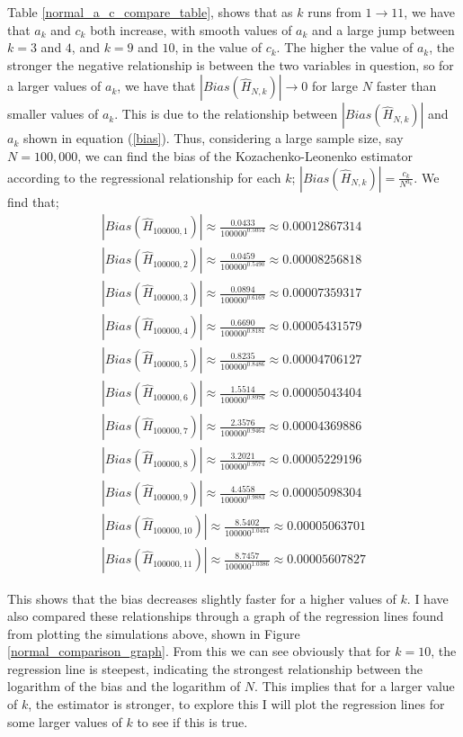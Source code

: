 \documentclass{report}
\begin{document}
Table \ref{normal_a_c_compare_table}, shows that as $k$ runs from $1 \to 11$, we have that $a_{k}$ and $c_{k}$ both increase, with smooth values of $a_{k}$ and a large jump between $k=3$ and $4$, and $k=9$ and $10$, in the value of $c_{k}$. The higher the value of $a_{k}$, the stronger the negative relationship is between the two variables in question, so for a larger values of $a_{k}$, we have that $|Bias(\hat{H}_{N, k})| \to 0$ for large $N$ faster than smaller values of $a_{k}$. This is due to the relationship between $|Bias(\hat{H}_{N, k})|$ and $a_{k}$ shown in equation (\ref{bias}). Thus, considering a large sample size, say $N=100,000$, we can find the bias of the Kozachenko-Leonenko estimator according to the regressional relationship for each $k$; $|Bias(\hat{H}_{N, k})| = \frac{c_{k}}{N^{a_{k}}}$. We find that;
\begin{gather*}
|Bias(\hat{H}_{100000, 1})| \approx  \frac{0.0433}{100000^{0.5054}}   \approx  0.00012867314\\
|Bias(\hat{H}_{100000, 2})| \approx  \frac{0.0459}{100000^{0.5490}}   \approx  0.00008256818\\
|Bias(\hat{H}_{100000, 3})| \approx  \frac{0.0894}{100000^{0.6169}}   \approx  0.00007359317\\
|Bias(\hat{H}_{100000, 4})| \approx  \frac{0.6690}{100000^{0.8181}}   \approx  0.00005431579\\
|Bias(\hat{H}_{100000, 5})| \approx  \frac{0.8235}{100000^{0.8486}}   \approx  0.00004706127\\
|Bias(\hat{H}_{100000, 6})| \approx  \frac{1.5514}{100000^{0.8976}}   \approx  0.00005043404 \\
|Bias(\hat{H}_{100000, 7})| \approx  \frac{2.3576}{100000^{0.9464}}   \approx  0.00004369886\\
|Bias(\hat{H}_{100000, 8})| \approx  \frac{3.2021}{100000^{0.9574}}   \approx  0.00005229196\\
|Bias(\hat{H}_{100000, 9})| \approx  \frac{4.4558}{100000^{0.9883}}   \approx  0.00005098304\\
|Bias(\hat{H}_{100000, 10})| \approx  \frac{8.5402}{100000^{1.0454}}   \approx  0.00005063701 \\
|Bias(\hat{H}_{100000, 11})| \approx  \frac{8.7457}{100000^{1.0386}}   \approx 0.00005607827
\end{gather*}


This shows that the bias decreases slightly faster for a higher values of $k$. I have also compared these relationships through a graph of the regression lines found from plotting the simulations above, shown in Figure \ref{normal_comparison_graph}. From this we can see obviously that for $k=10$, the regression line is steepest, indicating the strongest relationship between the logarithm of the bias and the logarithm of $N$. This implies that for a larger value of $k$, the estimator is stronger, to explore this I will plot the regression lines for some larger values of $k$ to see if this is true.
\end{document}
